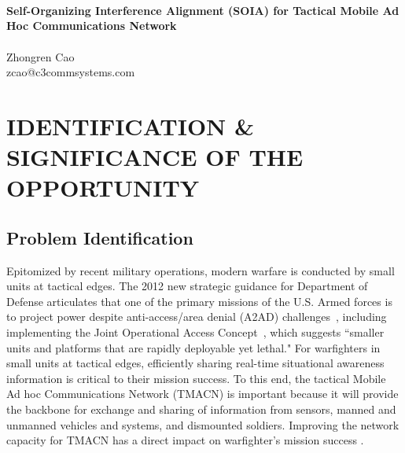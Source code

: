 \documentclass[letterpaper,11pt,onecolumn]{article}
\begin{document}
\thispagestyle{fancy}


\begin{center}
~\\
~\\
~\\
{\Large{\huge\bf{Self-Organizing Interference Alignment (SOIA) for Tactical Mobile Ad Hoc Communications Network}}}\\
~\\
\vspace{0.1in}
Zhongren Cao\\
zcao@c3commsystems.com
\end{center}

\vspace{0.1in}

\newpage

\section{IDENTIFICATION \& SIGNIFICANCE OF THE OPPORTUNITY}

\subsection{Problem Identification}
Epitomized by recent military operations, modern warfare is conducted by small units at tactical edges. The 2012 new strategic guidance for Department of Defense articulates that one of the primary missions of the U.S. Armed forces is to project power despite anti-access/area denial (A2AD) challenges~\cite{DoD:strategy2012}, including implementing the Joint Operational Access Concept~\cite{DoD:JOAC}, which suggests ``smaller units and platforms that are rapidly deployable yet lethal." For warfighters in small units at tactical edges, efficiently sharing real-time situational awareness information is critical to their mission success. To this end, the tactical Mobile Ad hoc Communications Network (TMACN) is important because it will provide the backbone for exchange and sharing of information from sensors, manned and unmanned vehicles and systems, and dismounted soldiers. Improving the network capacity for TMACN has a direct impact on warfighter's mission success . 

\end{document}
